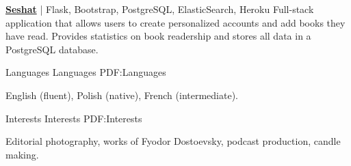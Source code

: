 \documentclass[letterpaper,MMMyyyy,nonstopmode]{simpleresumecv}
\begin{document}
\begin{Body}
\BigGap
\Entry
\href{https://github.com/miloszkowal/seshat}
{\textbf{Seshat}} | Flask, Bootstrap, PostgreSQL, ElasticSearch, Heroku
\hfill
\Gap
Full-stack application that allows users to create personalized accounts and add books they have read. Provides statistics on book readership and stores all data in a PostgreSQL database.







\noindent\hrulefill
\Section
{Languages}
{Languages}
{PDF:Languages}

English (fluent), Polish (native), French (intermediate).


\Section
{Interests}
{Interests}
{PDF:Interests}

Editorial photography, works of Fyodor Dostoevsky, podcast production, candle making.



\end{Body}


\BigGap
\UseNoteFont%
\null\hfill%
\end{document}
